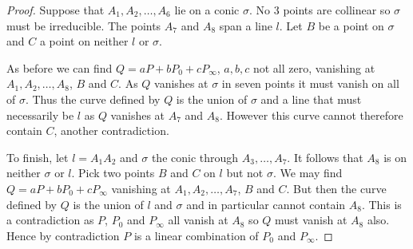 \documentclass[
10pt, %
a4paper, %
oneside, %
headinclude,footinclude, %
BCOR5mm, %
]{scrartcl}
\begin{document}
\begin{proof}

    Suppose that \(A_{1}, A_{2}, \ldots, A_{6}\) lie on a conic \(\sigma\). No 3 points are collinear so \(\sigma\) must be irreducible. The points \(A_{7}\) and \(A_{8}\) span a line \(l\). Let \(B\) be a point on \(\sigma\) and \(C\) a point on neither \(l\) or \(\sigma\).


    As before we can find \(Q = a P + b P_{0} + c P_{\infty}\), \(a, b, c\) not all zero, vanishing at \(A_{1}, A_{2}, \ldots, A_{8}\), \(B\) and \(C\). As \(Q\) vanishes at \(\sigma\) in seven points it must vanish on all of \(\sigma\). Thus the curve defined by \(Q\) is the union of \(\sigma\) and a line that must necessarily be \(l\) as \(Q\) vanishes at \(A_{7}\) and \(A_{8}\). However this curve cannot therefore contain \(C\), another contradiction.

    To finish, let \(l = A_{1}A_{2}\) and \(\sigma\) the conic through \(A_{3}, \ldots, A_{7}\). It follows that \(A_{8}\) is on neither \(\sigma\) or \(l\). Pick two points \(B\) and \(C\) on \(l\) but not \(\sigma\). We may find \(Q = aP + bP_{0} + c P_{\infty}\)  vanishing at \(A_{1}, A_{2}, \ldots, A_{7}\), \(B\) and \(C\).
    But then the curve defined by \(Q\) is the union of \(l\) and \(\sigma\) and in particular cannot contain \(A_{8}\). This is a contradiction as \(P\), \(P_{0}\) and \(P_{\infty}\) all vanish at \(A_{8}\) so \(Q\) must vanish at \(A_{8}\) also. Hence by contradiction \(P\) is a linear combination of \(P_{0}\) and \(P_{\infty}\).
\end{proof}
\end{document}
